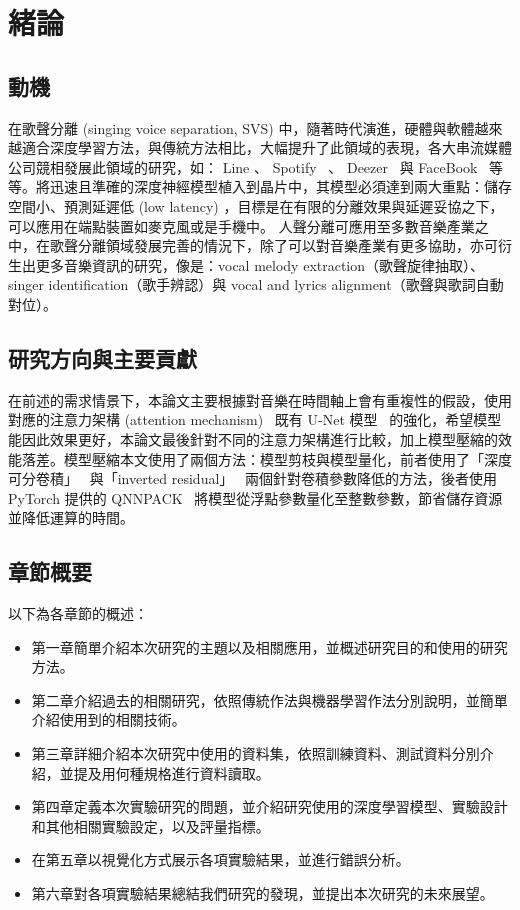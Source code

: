 \chapter{緒論}


\section{動機}
在歌聲分離 (singing voice separation, SVS) 中，隨著時代演進，硬體與軟體越來越適合深度學習方法，與傳統方法相比，大幅提升了此領域的表現，各大串流媒體公司競相發展此領域的研究，如： Line 、 Spotify~\cite{jansson2017singing} 、 Deezer~\cite{hennequin2020spleeter} 與 FaceBook~\cite{defossez2019music} 等等。將迅速且準確的深度神經模型植入到晶片中，其模型必須達到兩大重點：儲存空間小、預測延遲低 (low latency) ，目標是在有限的分離效果與延遲妥協之下，可以應用在端點裝置如麥克風或是手機中。
人聲分離可應用至多數音樂產業之中，在歌聲分離領域發展完善的情況下，除了可以對音樂產業有更多協助，亦可衍生出更多音樂資訊的研究，像是：vocal melody extraction（歌聲旋律抽取）、singer identification（歌手辨認）與 vocal and lyrics alignment（歌聲與歌詞自動對位）。


\section{研究方向與主要貢獻}
在前述的需求情景下，本論文主要根據對音樂在時間軸上會有重複性的假設，使用對應的注意力架構 (attention mechanism)~\cite{vaswani2017attention,oktay2018attention,shaw2018self,liu2020voice} 既有 U-Net 模型~\cite{ronneberger2015u} 的強化，希望模型能因此效果更好，本論文最後針對不同的注意力架構進行比較，加上模型壓縮的效能落差。模型壓縮本文使用了兩個方法：模型剪枝與模型量化，前者使用了「深度可分卷積」~\cite{chollet2017xception,howard2017mobilenets} 與「inverted residual」~\cite{sandler2018mobilenetv2} 兩個針對卷積參數降低的方法，後者使用 PyTorch 提供的 QNNPACK~\cite{dukhan2018qnnpack,wu2019machine} 將模型從浮點參數量化至整數參數，節省儲存資源並降低運算的時間。

\section{章節概要}
以下為各章節的概述：
\begin{itemize}
	\item 第一章簡單介紹本次研究的主題以及相關應用，並概述研究目的和使用的研究方法。
	\item 第二章介紹過去的相關研究，依照傳統作法與機器學習作法分別說明，並簡單介紹使用到的相關技術。
	\item 第三章詳細介紹本次研究中使用的資料集，依照訓練資料、測試資料分別介紹，並提及用何種規格進行資料讀取。
	\item 第四章定義本次實驗研究的問題，並介紹研究使用的深度學習模型、實驗設計和其他相關實驗設定，以及評量指標。
	\item 在第五章以視覺化方式展示各項實驗結果，並進行錯誤分析。
	\item 第六章對各項實驗結果總結我們研究的發現，並提出本次研究的未來展望。
\end{itemize}
